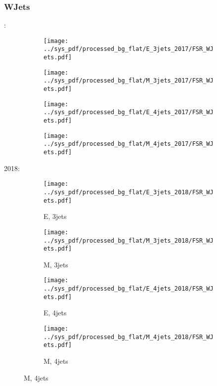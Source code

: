 \documentclass{beamer}
\begin{document}
\begin{frame}
\frametitle{WJets}
\fontsize{5}{1}:
\begin{figure}
\centering
\begin{subfigure}[b]{0.24\textwidth}
\texttt{[image: ../sys\_pdf/processed\_bg\_flat/E\_3jets\_2017/FSR\_WJets.pdf]}
\end{subfigure}
\begin{subfigure}[b]{0.24\textwidth}
\texttt{[image: ../sys\_pdf/processed\_bg\_flat/M\_3jets\_2017/FSR\_WJets.pdf]}
\end{subfigure}
\begin{subfigure}[b]{0.24\textwidth}
\texttt{[image: ../sys\_pdf/processed\_bg\_flat/E\_4jets\_2017/FSR\_WJets.pdf]}
\end{subfigure}
\begin{subfigure}[b]{0.24\textwidth}
\texttt{[image: ../sys\_pdf/processed\_bg\_flat/M\_4jets\_2017/FSR\_WJets.pdf]}
\end{subfigure}
\end{figure}
2018:
\begin{figure}
\centering
\begin{subfigure}[b]{0.24\textwidth}
\texttt{[image: ../sys\_pdf/processed\_bg\_flat/E\_3jets\_2018/FSR\_WJets.pdf]}
\captionsetup{font=tiny}
\caption{E, 3jets}
\end{subfigure}
\begin{subfigure}[b]{0.24\textwidth}
\texttt{[image: ../sys\_pdf/processed\_bg\_flat/M\_3jets\_2018/FSR\_WJets.pdf]}
\captionsetup{font=tiny}
\caption{M, 3jets}
\end{subfigure}
\begin{subfigure}[b]{0.24\textwidth}
\texttt{[image: ../sys\_pdf/processed\_bg\_flat/E\_4jets\_2018/FSR\_WJets.pdf]}
\captionsetup{font=tiny}
\caption{E, 4jets}
\end{subfigure}
\begin{subfigure}[b]{0.24\textwidth}
\texttt{[image: ../sys\_pdf/processed\_bg\_flat/M\_4jets\_2018/FSR\_WJets.pdf]}
\captionsetup{font=tiny}
\caption{M, 4jets}
\end{subfigure}
\end{figure}
\end{frame}
\end{document}
